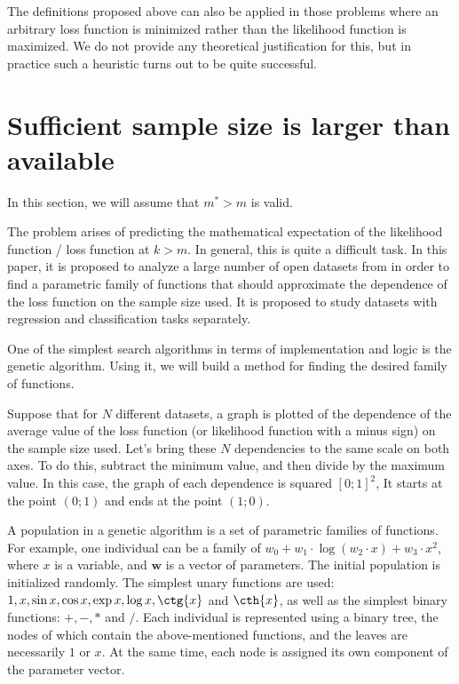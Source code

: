 \documentclass[
11pt,%
tightenlines,%
twoside,%
onecolumn,%
nofloats,%
nobibnotes,%
nofootinbib,%
superscriptaddress,%
noshowpacs,%
centertags]%
{revtex4-2}
\begin{document}
The definitions proposed above can also be applied in those problems where an arbitrary loss function is minimized rather than the likelihood function is maximized. We do not provide any theoretical justification for this, but in practice such a heuristic turns out to be quite successful.

\section{Sufficient sample size is larger than available}\label{sec3}

In this section, we will assume that $m^*> m$ is valid.

The problem arises of predicting the mathematical expectation of the likelihood function / loss function at $k > m$. In general, this is quite a difficult task. In this paper, it is proposed to analyze a large number of open datasets from \citep{UCI} in order to find a parametric family of functions that should approximate the dependence of the loss function on the sample size used. It is proposed to study datasets with regression and classification tasks separately.

One of the simplest search algorithms in terms of implementation and logic is the genetic algorithm. Using it, we will build a method for finding the desired family of functions. 

Suppose that for $N$ different datasets, a graph is plotted of the dependence of the average value of the loss function (or likelihood function with a minus sign) on the sample size used. Let's bring these $N$ dependencies to the same scale on both axes. To do this, subtract the minimum value, and then divide by the maximum value. In this case, the graph of each dependence is squared $[0; 1]^2$, It starts at the point $(0; 1)$ and ends at the point $(1; 0)$.

A population in a genetic algorithm is a set of parametric families of functions.
For example, one individual can be a family of $w_0 + w_1\cdot\log(w_2\cdot x) + w_3\cdot x^2$, where $x$ is a variable, and $\mathbf{w}$ is a vector of parameters. The initial population is initialized randomly. The simplest unary functions are used: $1, x, \sin{x}, \cos{x}, \exp{x}, \log{x}, \ctg{x}$ and $\cth{x}$, as well as the simplest binary functions: $+, -, *$ and $/$. Each individual is represented using a binary tree, the nodes of which contain the above-mentioned functions, and the leaves are necessarily $1$ or $x$. At the same time, each node is assigned its own component of the parameter vector.
\end{document}
